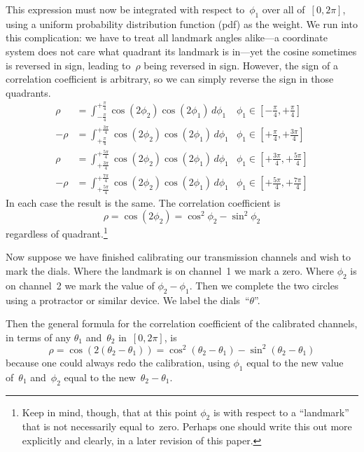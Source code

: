 \documentclass[9pt,technote]{IEEEtran}
\begin{document}
This expression must now be integrated with respect to~$\phi_1$ over
all of~$[0,2\pi]$, using a uniform probability distribution function
(pdf) as the weight. We run into this complication: we have to treat
all landmark angles alike---a coordinate system does not care what
quadrant its landmark is in---yet the cosine sometimes is reversed in
sign, leading to~$\rho$ being reversed in sign. However, the sign of a
correlation coefficient is arbitrary, so we can simply reverse the
sign in those quadrants.
\begin{align}
\rho &= \int_{-\frac{\pi}{4}}^{+\frac{\pi}{4}}\cos(2\phi_2)\cos(2\phi_1)\,d\phi_1&\phi_1\in[-\frac{\pi}{4},+\frac{\pi}{4}] \\
-\rho &= \int_{+\frac{\pi}{4}}^{+\frac{3\pi}{4}}\cos(2\phi_2)\cos(2\phi_1)\,d\phi_1&\phi_1\in[+\frac{\pi}{4},+\frac{3\pi}{4}] \\
\rho &= \int_{+\frac{3\pi}{4}}^{+\frac{5\pi}{4}}\cos(2\phi_2)\cos(2\phi_1)\,d\phi_1&\phi_1\in[+\frac{3\pi}{4},+\frac{5\pi}{4}] \\
-\rho &= \int_{+\frac{5\pi}{4}}^{+\frac{7\pi}{4}}\cos(2\phi_2)\cos(2\phi_1)\,d\phi_1&\phi_1\in[+\frac{5\pi}{4},+\frac{7\pi}{4}]
\end{align}
In each case the result is the same. The correlation coefficient is
\begin{equation}
  \rho = \cos(2\phi_2) = \cos^2\phi_2 - \sin^2\phi_2
\end{equation}
regardless of quadrant.\footnote{Keep in mind, though, that at this
  point $\phi_2$ is with respect to a ``landmark'' that is not
  necessarily equal to~zero. Perhaps one should write this out more
  explicitly and clearly, in a later revision of this paper.}

Now suppose we have finished calibrating our transmission channels and
wish to mark the dials. Where the landmark is on channel~1 we mark a
zero. Where $\phi_2$ is on channel~2 we mark the value of
$\phi_2-\phi_1$. Then we complete the two circles using a protractor
or similar device. We label the dials~``$\theta$''.

Then the general formula for the correlation coefficient of the
calibrated channels, in terms of any $\theta_1$ and~$\theta_2$
in~$[0,2\pi]$, is
\begin{equation}
  \rho = \cos(2(\theta_2-\theta_1)) = \cos^2(\theta_2-\theta_1) - \sin^2(\theta_2-\theta_1)
\end{equation}
because one could always redo the calibration, using $\phi_1$ equal to
the new value of~$\theta_1$ and~$\phi_2$ equal to the
new~$\theta_2-\theta_1$.
\end{document}
